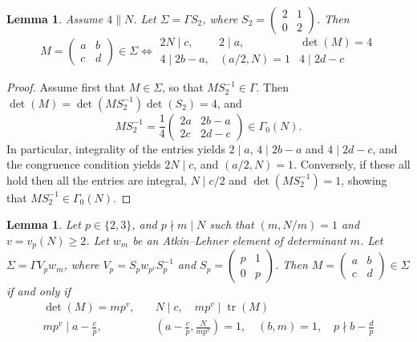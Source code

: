 \documentclass[12pt]{amsart}
\DeclareMathOperator{\tr}{tr}
\numberwithin{equation}{subsection}
\theoremstyle{plain}\newtheorem{ithm}{Theorem}
\theoremstyle{plain}\newtheorem{iprop}[ithm]{Proposition}
\newtheorem{lemma}[equation]{Lemma}
\theoremstyle{definition}
\theoremstyle{remark}
\newcommand{\mattwo}[4]{\left( \begin{array}{cc} {#1} & {#2} \\ {#3} & {#4} \end{array} \right)}
\begin{document}
\begin{lemma} Assume $4 \parallel N$.
    Let $\Sigma = \Gamma S_2$, where $S_2 = \mattwo{2}{1}{0}{2}$.
    Then 
    $$
    M = \mattwo{a}{b}{c}{d} \in \Sigma \iff 
    \begin{array}{ccc}
        2N \mid c,  & 2 \mid a, & \det(M) = 4  \\
        4 \mid 2b - a,  & (a/2, N) = 1 & 4 \mid 2d -c
    \end{array}
    $$
\end{lemma}

\begin{proof}
    Assume first that $M \in \Sigma$, so that $MS_2^{-1}\in \Gamma$.
    Then $\det(M) = \det(MS_2^{-1})\det(S_2) = 4$, and 
    $$
    MS_2^{-1} = \frac{1}{4} \mattwo{2a}{2b-a}{2c}{2d-c} \in \Gamma_0(N).
    $$
    In particular, integrality of the entries yields $2 \mid a$,  $4 \mid 2b - a$ and $4 \mid 2d - c$, and the congruence condition yields $2N \mid c$, and $(a/2,N) = 1$. Conversely, if these all hold then all the entries are integral, $N \mid c/2$ and $\det(MS_2^{-1}) = 1$, showing that $MS_2^{-1} \in \Gamma_0(N)$.
\end{proof}



\begin{lemma} 
\label{lem:congruence conditions for trace}
    Let $p \in \{2,3\}$, and $p \nmid m \mid N$ such that $(m, N/m) = 1$ and $v = v_p(N) \ge 2$. Let $w_m$ be an Atkin--Lehner element of determinant $m$. 
    Let $\Sigma = \Gamma V_p w_m$, where $V_p = S_p w_{p^v} S_p^{-1}$ and $S_p = \mattwo{p}{1}{0}{p}$.
    Then $M = \mattwo{a}{b}{c}{d} \in \Sigma$ if and only if 
    \begin{align}
        \det(M) = mp^v, \quad & N \mid c, \quad m p^v \mid \tr(M) \\
        mp^v \mid a - \frac{c}{p}, \quad & \left(a - \frac{c}{p}, \frac{N}{mp^v} \right) = 1
        , \quad (b, m) = 1, \quad p \nmid b - \frac{d}{p}
    \end{align}
\end{lemma}
\end{document}
